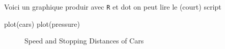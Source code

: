 \documentclass[
  a4paper,
]{scrbook}
\newenvironment{Shaded}{}{}
\newcommand{\FunctionTok}[1]{\textcolor[rgb]{0.44,0.26,0.76}{#1}}
\newcommand{\NormalTok}[1]{\textcolor[rgb]{0.14,0.16,0.18}{#1}}
\begin{document}
Voici un graphique produir avec \texttt{R} et dot on peut lire le
(court) script

\begin{Shaded}
\begin{Highlighting}[numbers=left,,]
\FunctionTok{plot}\NormalTok{(cars)}
\FunctionTok{plot}\NormalTok{(pressure)}
\end{Highlighting}
\end{Shaded}

\begin{figure}

\begin{minipage}[t]{0.50\linewidth}

{\centering 


\caption{Speed and Stopping Distances of Cars}

}

\end{minipage}%
%
\begin{minipage}[t]{0.50\linewidth}

{\centering 

}
\end{minipage}
\end{figure}
\end{document}
